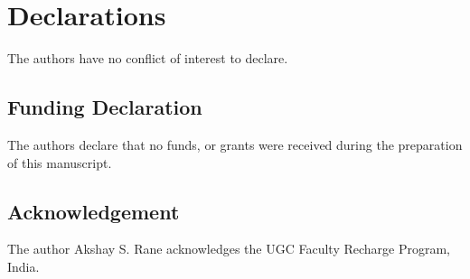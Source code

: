 \documentclass[pdflatex, sn-mathphys-num]{sn-jnl}%
\theoremstyle{thmstyleone}%
\theoremstyle{thmstyletwo}%
\theoremstyle{thmstylethree}%
\begin{document}


\section*{Declarations}
The authors have no conflict of interest to declare.

\subsection*{Funding Declaration}
The authors declare that no funds, or grants were received during the preparation of this manuscript.

\subsection*{Acknowledgement}
The author Akshay S. Rane acknowledges the UGC Faculty Recharge Program, India.


\end{document}
